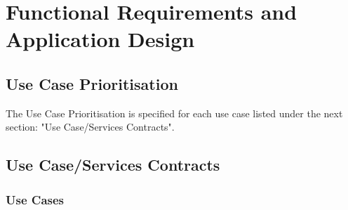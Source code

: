 \documentclass[a4paper,12pt]{article}
\begin{document}
\newpage
\section{Functional Requirements and Application Design}
\subsection{Use Case Prioritisation}
The Use Case Prioritisation is specified for each use case listed under the next section: "Use Case/Services Contracts".
\subsection{Use Case/Services Contracts}
	\subsubsection{Use Cases}
\end{document}
